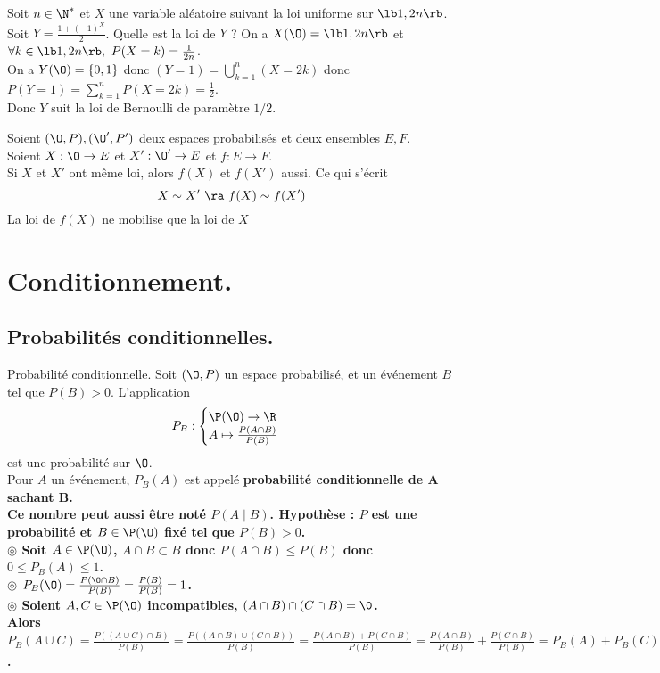 \documentclass[11pt]{article}
\begin{document}
\begin{ex}{}{}
    Soit $n\in\N^*$ et $X$ une variable aléatoire suivant la loi uniforme sur $\lb1,2n\rb$. Soit $Y=\frac{1+(-1)^X}{2}$. Quelle est la loi de $Y$ ?
    \tcblower
    On a $X(\O)=\lb1,2n\rb$ et $\forall k\in\lb1,2n\rb,~P(X=k)=\frac{1}{2n}$.\\
    On a $Y(\O)=\{0,1\}$ donc $(Y=1)=\bigcup_{k=1}^n(X=2k)$ donc $P(Y=1)=\sum_{k=1}^nP(X=2k)=\frac{1}{2}$.\\
    Donc $Y$ suit la loi de Bernoulli de paramètre $1/2$.
\end{ex}

\begin{prop}{}{}
    Soient $(\O,P), (\O',P')$ deux espaces probabilisés et deux ensembles $E,F$.\\
    Soient $X:\O\to E$ et $X':\O'\to E$ et $f:E\to F$.\\
    Si $X$ et $X'$ ont même loi, alors $f(X)$ et $f(X')$ aussi. Ce qui s'écrit
    \begin{equation*}
        X \sim X' ~ \ra ~ f(X) \sim f(X')
    \end{equation*}
    \tcblower
    La loi de $f(X)$ ne mobilise que la loi de $X$
\end{prop}

\section{Conditionnement.}
\subsection{Probabilités conditionnelles.}

\begin{defi}{Probabilité conditionnelle.}{}
    Soit $(\O,P)$ un espace probabilisé, et un événement $B$ tel que $P(B)>0$. L'application
    \begin{equation*}
        P_B:\begin{cases}\P(\O)\to\R\\A\mapsto\frac{P(A\cap B)}{P(B)}\end{cases}
    \end{equation*}
    est une probabilité sur $\O$.\\
    Pour $A$ un événement, $P_B(A)$ est appelé \bf{probabilité conditionnelle de A sachant B}.\\
    Ce nombre peut aussi être noté $P(A\mid B)$.
    \tcblower
    Hypothèse : $P$ est une probabilité et $B\in\P(\O)$ fixé tel que $P(B)>0$.\\
    $\circledcirc$ Soit $A\in\P(\O)$, $A\cap B\subset B$ donc $P(A\cap B)\leq P(B)$ donc $0\leq P_B(A)\leq1$.\\
    $\circledcirc$ $P_B(\O)=\frac{P(\O\cap B)}{P(B)}=\frac{P(B)}{P(B)}=1$.\\
    $\circledcirc$ Soient $A,C\in\P(\O)$ incompatibles, $(A\cap B)\cap(C\cap B)=\0$.\\
    Alors $P_B(A\cup C)=\frac{P((A\cup C)\cap B)}{P(B)}=\frac{P((A\cap B)\cup(C\cap B))}{P(B)}=\frac{P(A\cap B)+P(C\cap B)}{P(B)}=\frac{P(A\cap B)}{P(B)}+\frac{P(C\cap B)}{P(B)}=P_B(A)+P_B(C)$.
\end{defi}
\end{document}

